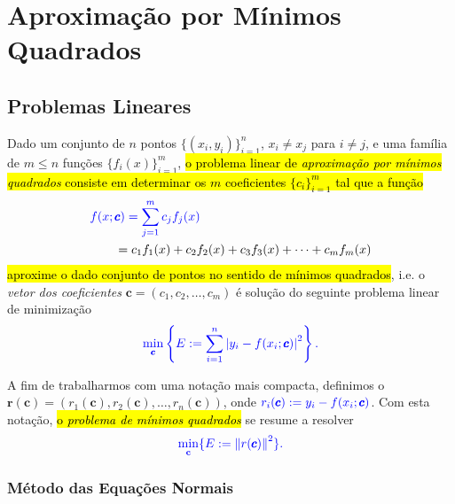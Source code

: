 \chapter{Aproximação por Mínimos Quadrados}\label{cap_ajuste}

\section{Problemas Lineares}\label{cap_ajuste_sec_prob_lin}

Dado um conjunto de $n$ pontos $\{(x_i,y_i)\}_{i=1}^n$, $x_i\neq x_j$ para $i\neq j$, e uma família de $m \leq n$ funções $\{f_i(x)\}_{i=1}^m$, \hl{o problema linear de \emph{aproximação por mínimos quadrados} consiste em determinar os $m$ coeficientes $\{c_i\}_{i=1}^m$ tal que a função}
\begin{align}
    &\color{blue}f(x; \pmb{c}) = \sum_{j=1}^m c_jf_j(x) \\
    & \text{}\qquad = c_1f_1(x) + c_2f_2(x) + c_3f_3(x) + \cdots + c_mf_m(x)
\end{align}
\hl{aproxime o dado conjunto de pontos no sentido de mínimos quadrados}, i.e. o \emph{vetor dos coeficientes} $\pmb{c} = (c_1, c_2, \dotsc, c_m)$ é solução do seguinte problema linear de minimização
\begin{equation}\color{blue}\min_{\pmb{c}} \left\{E:= \sum_{i=1}^n \left|y_i - f(x_i; \pmb{c})\right|^2\right\}.
\end{equation}

A fim de trabalharmos com uma notação mais compacta, definimos o  $\pmb{r}(\pmb{c}) = (r_1(\pmb{c}), r_2(\pmb{c}), \dotsc, r_n(\pmb{c}))$, onde $\color{blue}r_i(\pmb{c}) := y_i - f(x_i; \pmb{c})$. Com esta notação, \hl{o \emph{problema de mínimos quadrados}} se resume a resolver
\begin{equation}\label{cap_ajuste_sec_prob_lin:eq:pmq}\color{blue}\min_{\textbf{c}} \{E := \left\|r(\pmb{c})\right\|^2\}.
\end{equation}

\subsection{Método das Equações Normais}

